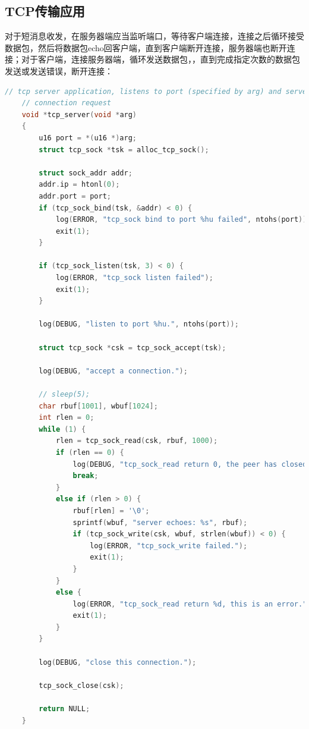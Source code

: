 \documentclass[UTF8]{report}
\begin{document}
\subsection{TCP传输应用}

对于短消息收发，在服务器端应当监听端口，等待客户端连接，连接之后循环接受数据包，然后将数据包echo回客户端，直到客户端断开连接，服务器端也断开连接；对于客户端，连接服务器端，循环发送数据包，，直到完成指定次数的数据包发送或发送错误，断开连接：

\begin{lstlisting}[language=C]
    // tcp server application, listens to port (specified by arg) and serves only one
    // connection request
    void *tcp_server(void *arg)
    {
        u16 port = *(u16 *)arg;
        struct tcp_sock *tsk = alloc_tcp_sock();
    
        struct sock_addr addr;
        addr.ip = htonl(0);
        addr.port = port;
        if (tcp_sock_bind(tsk, &addr) < 0) {
            log(ERROR, "tcp_sock bind to port %hu failed", ntohs(port));
            exit(1);
        }
    
        if (tcp_sock_listen(tsk, 3) < 0) {
            log(ERROR, "tcp_sock listen failed");
            exit(1);
        }
    
        log(DEBUG, "listen to port %hu.", ntohs(port));
    
        struct tcp_sock *csk = tcp_sock_accept(tsk);
    
        log(DEBUG, "accept a connection.");
    
        // sleep(5);
        char rbuf[1001], wbuf[1024];
        int rlen = 0;
        while (1) {
            rlen = tcp_sock_read(csk, rbuf, 1000);
            if (rlen == 0) {
                log(DEBUG, "tcp_sock_read return 0, the peer has closed.");
                break;
            } 
            else if (rlen > 0) {
                rbuf[rlen] = '\0';
                sprintf(wbuf, "server echoes: %s", rbuf);
                if (tcp_sock_write(csk, wbuf, strlen(wbuf)) < 0) {
                    log(ERROR, "tcp_sock_write failed.");
                    exit(1);
                }
            }
            else {
                log(ERROR, "tcp_sock_read return %d, this is an error.", rlen);
                exit(1);
            }
        }
    
        log(DEBUG, "close this connection.");
    
        tcp_sock_close(csk);
        
        return NULL;
    }
    

\end{lstlisting}
\end{document}
